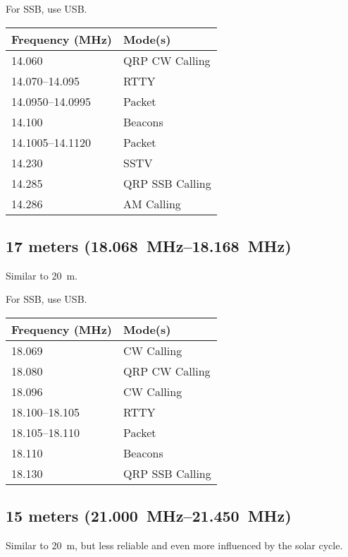 \documentclass[11pt, onecolumn, table]{article}
\begin{document}
For SSB, use USB.
\begin{center}
  \begin{tabular}{l l}
    {Frequency (\si{\MHz})}		& Mode(s)			\\
    \midrule
    \num{14.060}				& QRP CW Calling	\\
    \numrange{14.070}{14.095}	& RTTY				\\
    \numrange{14.0950}{14.0995}	& Packet			\\
    \num{14.100}				& Beacons			\\
    \numrange{14.1005}{14.1120}	& Packet			\\
    \num{14.230}				& SSTV				\\
    \num{14.285}				& QRP SSB Calling	\\
    \num{14.286}				& AM Calling		\\
  \end{tabular}
\end{center}


\newpage
\subsection{17 meters (\SIrange{18.068}{18.168}{\MHz})}
Similar to \SI{20}{m}.

For SSB, use USB.
\begin{center}
  \begin{tabular}{l l}
    {Frequency (\si{\MHz})}			& Mode(s)			\\
    \midrule
    \num{18.069}					& CW Calling		\\
    \num{18.080}					& QRP CW Calling	\\
    \num{18.096}					& CW Calling		\\
    \numrange{18.100}{18.105}		& RTTY				\\
    \numrange{18.105}{18.110}		& Packet			\\
    \num{18.110}					& Beacons			\\
    \num{18.130}					& QRP SSB Calling	\\
  \end{tabular}
\end{center}


\subsection{15 meters (\SIrange{21.000}{21.450}{\MHz})}
Similar to \SI{20}{m}, but less reliable and even more influenced
by the solar cycle.
\end{document}
